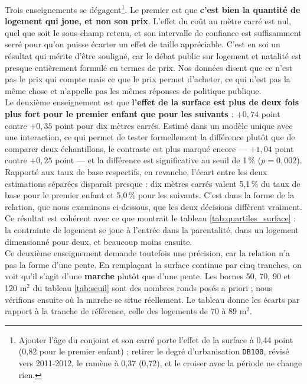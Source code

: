 \documentclass[12pt,a4paper]{article}
\begin{document}
\bigskip

\noindent Trois enseignements se dégagent\footnote{Ajouter l'âge du conjoint et son carré porte l'effet de la surface à 0,44 point (0,82 pour le premier enfant) ; retirer le degré d'urbanisation \texttt{DB100}, révisé vers 2011-2012, le ramène à 0,37 (0,72), et le croiser avec la période ne change rien.}. Le premier est que \textbf{c'est bien la quantité de logement qui joue, et non son prix}. L'effet du coût au mètre carré est nul, quel que soit le sous-champ retenu, et son intervalle de confiance est suffisamment serré pour qu'on puisse écarter un effet de taille appréciable. C'est en soi un résultat qui mérite d'être souligné, car le débat public sur logement et natalité est presque entièrement formulé en termes de prix. Nos données disent que ce n'est pas le prix qui compte mais ce que le prix permet d'acheter, ce qui n'est pas la même chose et n'appelle pas les mêmes réponses de politique publique. \\

\noindent Le deuxième enseignement est que \textbf{l'effet de la surface est plus de deux fois plus fort pour le premier enfant que pour les suivants} : $+0{,}74$ point contre $+0{,}35$ point pour dix mètres carrés. Estimé dans un modèle unique avec une interaction, ce qui permet de tester formellement la différence plutôt que de comparer deux échantillons, le contraste est plus marqué encore — $+1{,}04$ point contre $+0{,}25$ point — et la différence est significative au seuil de 1\,\% ($p = 0{,}002$). Rapporté aux taux de base respectifs, en revanche, l'écart entre les deux estimations séparées disparaît presque : dix mètres carrés valent 5,1\,\% du taux de base pour le premier enfant et 5,0\,\% pour les suivants. C'est dans la forme de la relation, que nous examinons ci-dessous, que les deux décisions diffèrent vraiment. Ce résultat est cohérent avec ce que montrait le tableau \ref{tab:quartiles_surface} : la contrainte de logement se joue à l'entrée dans la parentalité, dans un logement dimensionné pour deux, et beaucoup moins ensuite. \\

\noindent Ce deuxième enseignement demande toutefois une précision, car la relation n'a pas la forme d'une pente. En remplaçant la surface continue par cinq tranches, on voit qu'il s'agit d'une \textbf{marche} plutôt que d'une pente. Les bornes 50, 70, 90 et 120 m$^2$ du tableau \ref{tab:seuil} sont des nombres ronds posés a priori ; nous vérifions ensuite où la marche se situe réellement. Le tableau donne les écarts par rapport à la tranche de référence, celle des logements de 70 à 89 m$^2$. \\
\end{document}
